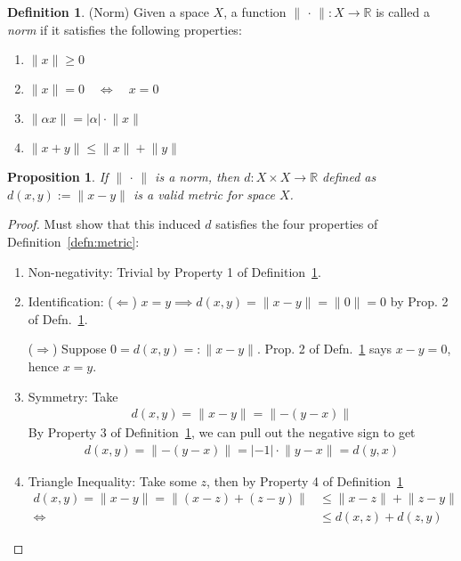 \documentclass[12pt]{article}
\numberwithin{equation}{section} %
\theoremstyle{plain}
\newtheorem{prop}[thm]{Proposition}
\theoremstyle{definition}
\newtheorem{defn}[thm]{Definition}
\theoremstyle{remark}
\newcommand{\R}{\mathbb{R}}
\begin{document}
\begin{defn}(Norm)
\label{defn:norm}
Given a space $X$, a function $\lVert\,\cdot\,\rVert:X\rightarrow \R$ is
called a \emph{norm} if it satisfies the following properties:
\begin{enumerate}
  \item $\lVert x\rVert\geq 0$
  \item $\lVert x\rVert=0 \quad \iff \quad x=0$
  \item $\lVert \alpha x\rVert= |\alpha| \cdot \lVert x\rVert$
  \item $\lVert x+y\rVert \leq \lVert x\rVert + \lVert y\rVert$
\end{enumerate}
\end{defn}

\begin{prop}
If $\lVert \,\cdot\,\rVert$ is a norm, then $d:X \times X\rightarrow \R$
defined as $d(x,y):=\lVert x-y\rVert$ is a valid metric for space $X$.
\end{prop}
\begin{proof}
Must show that this induced $d$ satisfies the four properties of
Definition~\ref{defn:metric}:
\begin{enumerate}
  \item Non-negativity: Trivial by Property 1 of
    Definition~\ref{defn:norm}.
  \item Identification: ($\Leftarrow$) $x=y\implies d(x,y)=\lVert
    x-y\rVert=\lVert 0\rVert=0$ by Prop. 2 of Defn.~\ref{defn:norm}.

    ($\Rightarrow$) Suppose $0 = d(x,y) =: \lVert x-y\rVert$. Prop. 2
    of Defn.~\ref{defn:norm} says $x-y=0$, hence $x=y$.

  \item Symmetry: Take
    \begin{align*}
      d(x,y)= \lVert x-y\rVert= \lVert -(y-x)\rVert
    \end{align*}
    By Property 3 of
    Definition~\ref{defn:norm}, we can pull out the negative sign to get
    \begin{align*}
      d(x,y)= \lVert -(y-x)\rVert =|-1| \cdot \lVert y-x\rVert = d(y,x)
    \end{align*}
  \item Triangle Inequality: Take some $z$, then by Property 4 of
    Definition~\ref{defn:norm}
    \begin{align*}
      d(x,y) = \lVert x-y\rVert
      = \lVert (x-z)+ (z-y) \rVert
      &\leq \lVert x-z\rVert +\lVert z-y\rVert
      \\
      \Leftrightarrow\qquad
      &\leq d(x,z) + d(z,y)
    \end{align*}
\end{enumerate}
\end{proof}
\end{document}
